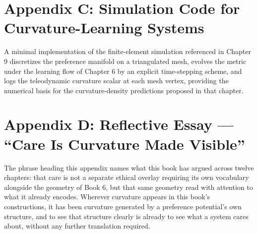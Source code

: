 \chapter*{Appendix C: Simulation Code for Curvature-Learning Systems}

A minimal implementation of the finite-element simulation referenced in Chapter 9 discretizes the preference manifold on a triangulated mesh, evolves the metric under the learning flow of Chapter 6 by an explicit time-stepping scheme, and logs the teleodynamic curvature scalar at each mesh vertex, providing the numerical basis for the curvature-density predictions proposed in that chapter.

\chapter*{Appendix D: Reflective Essay --- ``Care Is Curvature Made Visible''}

The phrase heading this appendix names what this book has argued across twelve chapters: that care is not a separate ethical overlay requiring its own vocabulary alongside the geometry of Book 6, but that same geometry read with attention to what it already encodes. Wherever curvature appears in this book's constructions, it has been curvature generated by a preference potential's own structure, and to see that structure clearly is already to see what a system cares about, without any further translation required.
